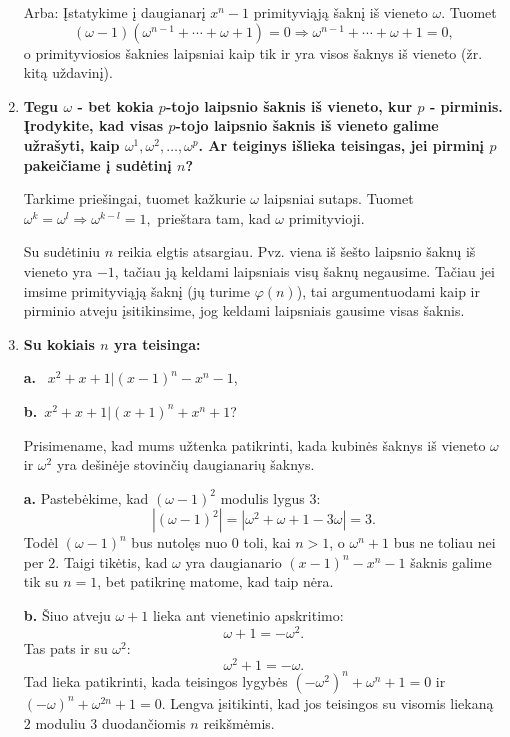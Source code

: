 \begin{enumerate}
Arba: Įstatykime į daugianarį $x^n - 1$ primityviąją šaknį iš vieneto $\omega$. Tuomet $$(\omega-1)(\omega^{n-1} + \cdots + \omega + 1) = 0 \Rightarrow \omega^{n-1} + \cdots + \omega + 1 = 0,$$ o primityviosios šaknies laipsniai kaip tik ir yra visos šaknys iš vieneto (žr. kitą uždavinį).

\medskip

\item {\bf Tegu $\omega$ - bet kokia $p$-tojo laipsnio šaknis iš vieneto, kur $p$ - pirminis. Įrodykite, kad visas $p$-tojo laipsnio šaknis iš vieneto galime užrašyti, kaip $\omega^1, \omega^2, \dots, \omega^p$. Ar teiginys išlieka teisingas, jei pirminį $p$ pakeičiame į sudėtinį $n$? }

\medskip

Tarkime priešingai, tuomet kažkurie $\omega$ laipsniai sutaps. Tuomet $\omega^k = \omega^l \Rightarrow \omega^{k-l} = 1,$ prieštara tam, kad $\omega$ primityvioji. 

Su sudėtiniu $n$ reikia elgtis atsargiau. Pvz. viena iš šešto laipsnio šaknų iš vieneto yra $-1$, tačiau ją keldami laipsniais visų šaknų negausime. Tačiau jei imsime primityviąją šaknį (jų turime $\varphi(n)$), tai argumentuodami kaip ir pirminio atveju įsitikinsime, jog keldami laipsniais gausime visas šaknis.

\medskip

\item {\bf Su kokiais $n$ yra teisinga:

{\bf a.} \ $x^2 + x + 1|(x-1)^n - x^n - 1$,

{\bf b.} \,$x^2 + x + 1|(x+1)^n + x^n + 1$?}

\medskip

Prisimename, kad mums užtenka patikrinti, kada kubinės šaknys iš vieneto $\omega$ ir $\omega^2$ yra dešinėje stovinčių daugianarių šaknys. 

{\bf a.} Pastebėkime, kad $(\omega-1)^2$ modulis lygus $3$:$$|(\omega-1)^2| = |\omega^2 + \omega + 1 - 3\omega| = 3.$$ Todėl $(\omega - 1)^n$ bus nutolęs nuo 0 toli, kai $n>1$, o $\omega^n + 1$ bus ne toliau nei per $2$. Taigi tikėtis, kad $\omega$ yra daugianario $(x-1)^n - x^n - 1$ šaknis galime tik su $n=1$, bet patikrinę matome, kad taip nėra. 

{\bf b.} Šiuo atveju $\omega + 1$ lieka ant vienetinio apskritimo: $$\omega + 1 = -\omega^2.$$ Tas pats ir su $\omega^2$: $$\omega^2 + 1 = -\omega.$$ Tad lieka patikrinti, kada teisingos lygybės $(-\omega^2)^n + \omega^n + 1 = 0$ ir $(-\omega)^n + \omega^{2n}+1=0$. Lengva įsitikinti, kad jos teisingos su visomis liekaną $2$ moduliu $3$ duodančiomis $n$ reikšmėmis.  


\end{enumerate}
